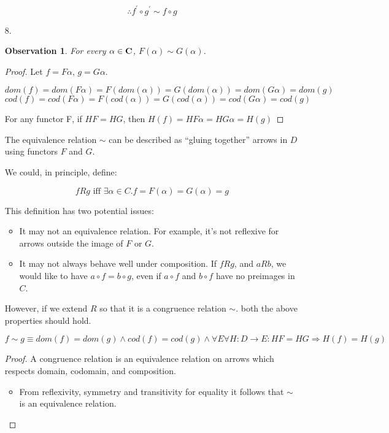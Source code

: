 \documentclass{article}
\newtheorem{observation}{Observation}
\begin{document}
\begin{enumerate}
    $$\therefore f^\prime \circ g^\prime \sim f \circ g$$
    
  \item[8.]

    \begin{observation}\label{obs:eq-alpha}
    For every $\alpha \in \text{\bf C}$, $F(\alpha) \sim G(\alpha)$.
    \end{observation}
    \begin{proof}
      Let $f = Fα$, $g = Gα$.
      
      $$dom(f) = dom(Fα) = F(dom(α)) = G(dom(α)) = dom(Gα) = dom(g)$$
      $$cod(f) = cod(Fα) = F(cod(α)) = G(cod(α)) = cod(Gα) = cod(g)$$

      For any functor F, if $HF = HG$, then $H(f) = HFα = HGα = H(g)$
    \end{proof}

    The equivalence relation $\sim$ can be described as “gluing
    together” arrows in $D$ using functors $F$ and $G$.

    We could, in principle, define:

    $$ f R g \text{ iff } \exists α \in C. f = F(α) = G(α) = g $$

    This definition has two potential issues:

    \begin{itemize}
      \item It may not an equivalence relation. For example, it's not
        reflexive for arrows outside the image of $F$ or $G$. 
      \item It may not always behave well under composition. If
        $f R g$, and $a R b$, we would like to have
        $a \circ f = b \circ g$, even if $a \circ f$ and $b \circ f$ have
        no preimages in $C$.
    \end{itemize}

    However, if we extend $R$ so that it is a congruence relation $\sim$.
    both the above properties should hold.

    $$ f \sim g \equiv dom(f ) = dom(g) \wedge cod(f ) = cod(g) \wedge \forall E \forall H : D → E : HF = HG ⇒ H(f ) = H(g)$$

    \begin{proof}

      A congruence relation is an equivalence relation on arrows which
      respects domain, codomain, and composition.

    \begin{itemize}
      \item From reflexivity, symmetry and transitivity for equality
        it follows that $\sim$ is an equivalence relation.           


\end{itemize}
\end{proof}
\end{enumerate}
\end{document}
